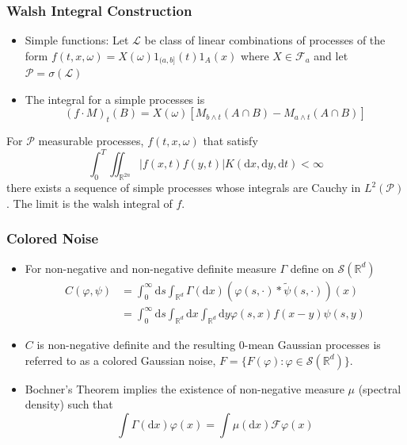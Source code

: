 \documentclass[11pt]{beamer}
\numberwithin{equation}{section}
\newcommand{\R}{\mathbb{R}}
\newcommand{\ud}{\ensuremath{\mathrm{d}}}
\begin{document}
\begin{frame}[t]
	\frametitle{Walsh Integral Construction}
	
\begin{itemize}
	\item Simple functions: Let $\mathscr{L}$ be class of linear combinations of processes of the form $f(t,x,\omega) = X(\omega)1_{(a,b]}(t)1_A(x)$ where $X \in \mathcal{F}_a$ and let $\mathscr{P} = \sigma(\mathscr{L})$
	
	\item The integral for a simple processes is
	\[
		(f\cdot M)_t(B) = X(\omega)\left[M_{b \wedge t}(A \cap B) - M_{a \wedge t}(A \cap B)\right]
	\]
\end{itemize}

	\begin{theorem}
		For $\mathscr{P}$ measurable processes, $f(t,x,\omega)$ that satisfy 
	\[
		\int_0^T\iint_{\R^{2n}}|f(x,t)f(y,t)|K(\ud x, \ud y, \ud t) < \infty
	\]
	there exists a sequence of simple processes whose integrals are Cauchy in $L^2(\mathscr{P})$. The limit is the walsh integral of $f$. 
	\end{theorem}



\end{frame}

\begin{frame}[t]
	\frametitle{Colored Noise}
	
\begin{itemize}
	\item For non-negative and non-negative definite measure $\Gamma$ define on $\mathscr{S}(\R^d)$
	\begin{align*}
	C(\varphi, \psi) &= \int_0^\infty \ud s \int_{\R^d} \Gamma(\ud x) (\varphi(s,\cdot)*\tilde{\psi}(s,\cdot))(x)
	\\& = \int_0^\infty \ud s \int_{\R^d} \ud x \int_{\R^d} \ud y \varphi(s,x)f(x-y)\psi(s,y)
	\end{align*}
	
	\item $C$ is non-negative definite and the resulting $0$-mean Gaussian processes is referred to as a colored Gaussian noise, $F = \{F(\varphi): \varphi \in \mathscr{S}(\R^d) \}$. 
	
	\item Bochner's Theorem implies the existence of non-negative measure $\mu$ (spectral density) such that 
	\[
		\int \Gamma(\ud x) \varphi(x) = \int \mu(\ud x) \mathcal{F}\varphi(x)
	\]
\end{itemize}

\end{frame}
\end{document}
